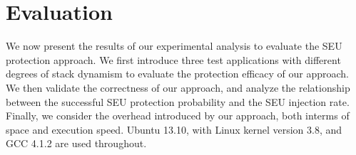 \section{Evaluation}\label{sec:evaluation}
We now present the results of our experimental analysis to evaluate the SEU protection approach. We first introduce three test applications with different degrees of stack dynamism to evaluate the protection efficacy of our approach. We then validate the correctness of our approach, and analyze the relationship between the successful SEU protection probability and the SEU injection rate. Finally, we consider the overhead introduced by our approach, both interms of space and execution speed. Ubuntu 13.10, with Linux kernel version 3.8, and GCC 4.1.2 are used throughout.

